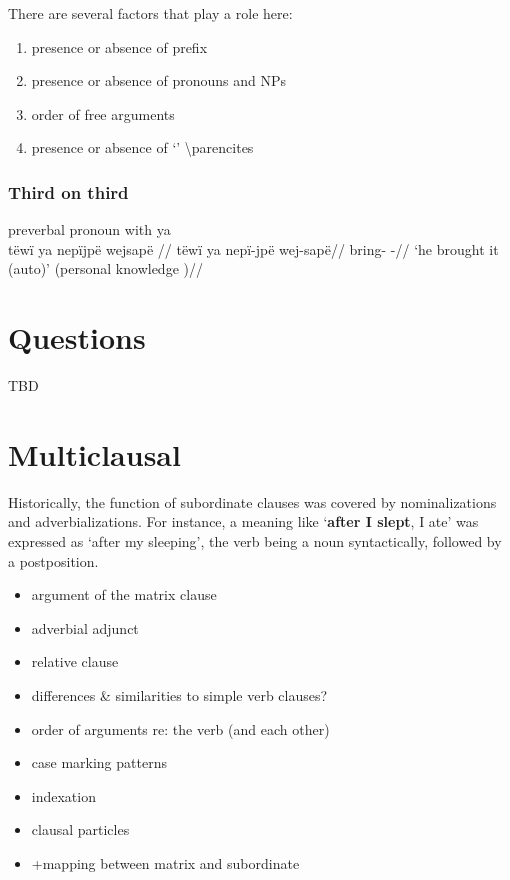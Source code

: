 \documentclass{memoir}
\begin{document}
There are several factors that play a role here:

\begin{enumerate}
\def\labelenumi{\arabic{enumi}.}
\tightlist
\item
  presence or absence of prefix
\item
  presence or absence of pronouns and NPs
\item
  order of free arguments
\item
  presence or absence of  `' \textbackslash parencites
\end{enumerate}

\subsection{Third on third}

\ex  preverbal pronoun with ya  \\\label{convcosnoind-132}
\begingl \glpreamble tëwï ya nepïjpë wejsapë //
\gla tëwï ya nepï-jpë wej-sapë//
\glb {}  bring- -//
\glft ‘he brought it (auto)’ (personal knowledge
)//
\endgl
\xe

\chapter{\texorpdfstring{Questions \label{questions}}{Questions }}

TBD

\chapter{\texorpdfstring{Multiclausal
\label{multiclausal}}{Multiclausal }}

Historically, the function of subordinate clauses was covered by
nominalizations and adverbializations. For instance, a meaning like
`\textbf{after I slept}, I ate' was expressed as `after my sleeping',
the verb being a noun syntactically, followed by a postposition.

\begin{itemize}
\item
  argument of the matrix clause
\item
  adverbial adjunct
\item
  relative clause
\item
  differences \& similarities to simple verb clauses?
\item
  order of arguments re: the verb (and each other)
\item
  case marking patterns
\item
  indexation
\item
  clausal particles
\item
  +mapping between matrix and subordinate
\end{itemize}
\end{document}
